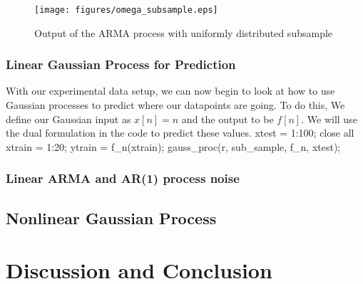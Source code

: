 \documentclass[11pt, twoside]{article}   	%
\newenvironment{matlab}{\comment}{\endcomment}
\begin{document}
\begin{figure}[h]
\centering
\texttt{[image: figures/omega\_subsample.eps]}
\caption{Output of the ARMA process with uniformly distributed subsample}
\label{fig:omega_subsample} 
\end{figure}
\FloatBarrier

\subsubsection{Linear Gaussian Process for Prediction}
With our experimental data setup, we can now begin to look at how to use
Gaussian processes to predict where our datapoints are going. To do this, 
We define our Gaussian input as $x[n] = n$ and the output to be $f[n]$. 
We will use the dual formulation in the code to predict these values. 
\begin{matlab}
xtest = 1:100;
close all
xtrain = 1:20; 
ytrain = f_n(xtrain); 
gauss_proc(r, sub_sample, f_n, xtest);


\end{matlab}



\subsubsection{Linear ARMA and AR(1) process noise}
\subsection{Nonlinear Gaussian Process}

\section{Discussion and Conclusion}



\end{document}
